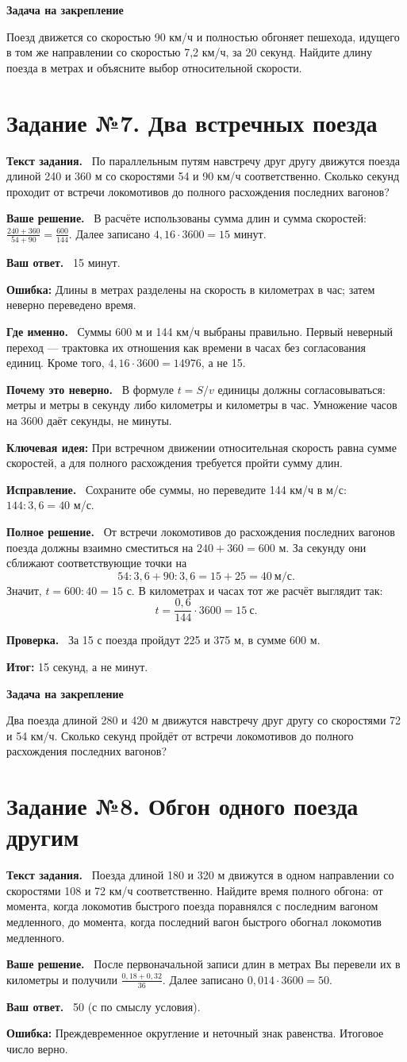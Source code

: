 \documentclass[a4paper,12pt]{article}
\newcommand{\task}[2]{\clearpage\phantomsection\label{task:#1}\section*{\textcolor{darkaccent}{Задание №#1. #2}}}
\newcommand{\parthead}[1]{\par\textbf{#1.}\ }
\newcommand{\error}[1]{\par\textcolor{red!75!black}{\textbf{Ошибка:}} #1\par}
\newcommand{\idea}[1]{\par\textcolor{blue!60!black}{\textbf{Ключевая идея:}} #1\par}
\newcommand{\result}[1]{\par\textcolor{darkaccent}{\textbf{Итог:}} #1\par}
\newcommand{\practice}[1]{\par\medskip\textcolor{accent}{\textbf{Задача на закрепление}}\par #1}
\begin{document}
\practice{Поезд движется со скоростью 90 км/ч и полностью обгоняет пешехода, идущего в том же направлении со скоростью 7,2 км/ч, за 20 секунд. Найдите длину поезда в метрах и объясните выбор относительной скорости.}
\task{7}{Два встречных поезда}
\parthead{Текст задания} По параллельным путям навстречу друг другу движутся поезда длиной 240 и 360 м со скоростями 54 и 90 км/ч соответственно. Сколько секунд проходит от встречи локомотивов до полного расхождения последних вагонов?
\parthead{Ваше решение} В расчёте использованы сумма длин и сумма скоростей: $\frac{240+360}{54+90}=\frac{600}{144}$. Далее записано $4{,}16\cdot3600=15$ минут.
\parthead{Ваш ответ} 15 минут.
\error{Длины в метрах разделены на скорость в километрах в час; затем неверно переведено время.}
\parthead{Где именно} Суммы 600 м и 144 км/ч выбраны правильно. Первый неверный переход --- трактовка их отношения как времени в часах без согласования единиц. Кроме того, $4{,}16\cdot3600=14976$, а не 15.
\parthead{Почему это неверно} В формуле $t=S/v$ единицы должны согласовываться: метры и метры в секунду либо километры и километры в час. Умножение часов на 3600 даёт секунды, не минуты.
\idea{При встречном движении относительная скорость равна сумме скоростей, а для полного расхождения требуется пройти сумму длин.}
\parthead{Исправление} Сохраните обе суммы, но переведите 144 км/ч в м/с: $144:3{,}6=40$ м/с.
\parthead{Полное решение} От встречи локомотивов до расхождения последних вагонов поезда должны взаимно сместиться на $240+360=600$ м. За секунду они сближают соответствующие точки на
\[54:3{,}6+90:3{,}6=15+25=40\ \text{м/с}.\]
Значит, $t=600:40=15$ с. В километрах и часах тот же расчёт выглядит так:
\[t=\frac{0{,}6}{144}\cdot3600=15\ \text{с}.\]
\parthead{Проверка} За 15 с поезда пройдут 225 и 375 м, в сумме 600 м.
\result{15 секунд, а не минут.}
\practice{Два поезда длиной 280 и 420 м движутся навстречу друг другу со скоростями 72 и 54 км/ч. Сколько секунд пройдёт от встречи локомотивов до полного расхождения последних вагонов?}
\task{8}{Обгон одного поезда другим}
\parthead{Текст задания} Поезда длиной 180 и 320 м движутся в одном направлении со скоростями 108 и 72 км/ч соответственно. Найдите время полного обгона: от момента, когда локомотив быстрого поезда поравнялся с последним вагоном медленного, до момента, когда последний вагон быстрого обогнал локомотив медленного.
\parthead{Ваше решение} После первоначальной записи длин в метрах Вы перевели их в километры и получили $\frac{0{,}18+0{,}32}{36}$. Далее записано $0{,}014\cdot3600=50$.
\parthead{Ваш ответ} 50 (с по смыслу условия).
\error{Преждевременное округление и неточный знак равенства. Итоговое число верно.}
\end{document}
